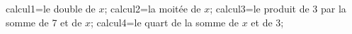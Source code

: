 \documentclass[exercice]{thedocument}%
\begin{document}
%
    \>calcul1=le double de $x$;%
    \>calcul2=la moitée de $x$;%
    \>calcul3=le produit de 3 par la somme de 7 et de $x$;%
    \>calcul4=le quart de la somme de $x$ et de 3;%
\end{document}
